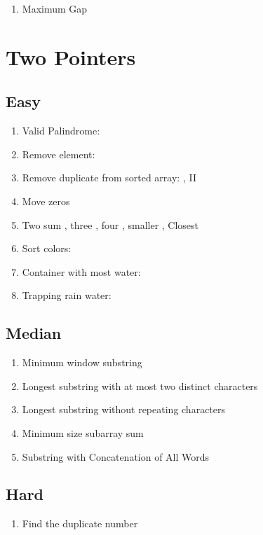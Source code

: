 \documentclass[DIV=calc, paper=a4, fontsize=11pt, twocolumn]{scrartcl}	 %
\begin{document}
\begin{enumerate}
\item Maximum Gap \cite{164} 
\end{enumerate}


\section*{Two Pointers}

\subsection*{Easy}

\begin{enumerate}
\item Valid Palindrome: \cite{125} 
\item Remove element: \cite{027}
\item Remove duplicate from sorted array: \cite{026}, II \cite{080}
\item Move zeros \cite{283}
\item Two sum \cite{167}, three \cite{015}, four \cite{018}, smaller \cite{259}, Closest \cite{016}
\item Sort colors: \cite{075} 
\item Container with most water: \cite{011}
\item Trapping rain water: \cite{042} 
\end{enumerate}

\subsection*{Median}

\begin{enumerate}
\item Minimum window substring \cite{076}
\item Longest substring with at most two distinct characters \cite{159}
\item Longest substring without repeating characters \cite{003}
\item Minimum size subarray sum \cite{209}
\item {\color{red} Substring with Concatenation of All Words} \cite{030}
\end{enumerate}

\subsection*{Hard}
\begin{enumerate}
\item {\color{red} Find the duplicate number} \cite{287}
\end{enumerate}
\end{document}
